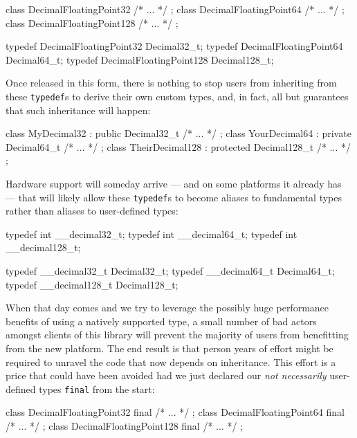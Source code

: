 {{\begin{emcppslisting}[emcppsbatch=e2]
class DecimalFloatingPoint32  { /* ... */ };
class DecimalFloatingPoint64  { /* ... */ };
class DecimalFloatingPoint128 { /* ... */ };

typedef DecimalFloatingPoint32  Decimal32_t;
typedef DecimalFloatingPoint64  Decimal64_t;
typedef DecimalFloatingPoint128 Decimal128_t;
\end{emcppslisting}
    

\noindent Once released in this form, there is nothing to stop users from
inheriting from these \lstinline!typedef!s to derive their own custom
types, and, in fact,  all but guarantees that such
inheritance will happen:

\begin{emcppslisting}[emcppsbatch=e2]
class MyDecimal32     : public Decimal32_t     { /* ... */ };
class YourDecimal64   : private Decimal64_t    { /* ... */ };
class TheirDecimal128 : protected Decimal128_t { /* ... */ };
\end{emcppslisting}
    

\noindent Hardware support will someday arrive --- and on some platforms it
already has --- that will likely allow these \lstinline!typedef!s to become
aliases to fundamental types rather than aliases to user-defined types:

\begin{emcppshiddenlisting}[emcppsbatch=e3]
typedef int __decimal32_t;
typedef int __decimal64_t;
typedef int __decimal128_t;
\end{emcppshiddenlisting}
\begin{emcppslisting}[emcppsbatch=e3]
typedef __decimal32_t  Decimal32_t;
typedef __decimal64_t  Decimal64_t;
typedef __decimal128_t Decimal128_t;
\end{emcppslisting}
    

\noindent When that day comes and we try to leverage the possibly huge performance
benefits of using a natively supported type, a small number of bad
actors amongst clients of this library will prevent the majority of
users from benefitting from the new platform. The end result is that
person years of effort might be required to unravel the code that now
depends on inheritance. This effort is a price that could have been
avoided had we just declared our \emph{not necessarily} user-defined
types \lstinline!final! from the start:

\begin{emcppslisting}
class DecimalFloatingPoint32 final  { /* ... */ };
class DecimalFloatingPoint64 final  { /* ... */ };
class DecimalFloatingPoint128 final { /* ... */ };
\end{emcppslisting}
    

}}
